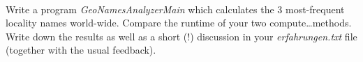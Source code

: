  \\
Write a program \textit{GeoNamesAnalyzerMain} which calculates the 3
most-frequent locality names world-wide. Compare the runtime of your two
compute\ldots methods.
Write down the results as well as a short (!) discussion in your
\textit{erfahrungen.txt} file (together with the usual feedback).
